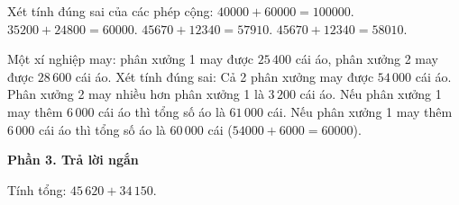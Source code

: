\begin{ex} %
Xét tính đúng sai của các phép cộng:
\choiceTF
{\True $40000 + 60000 = 100000$.}
{\True $35200 + 24800 = 60000$.}
{$45670 + 12340 = 57910$.}
{\True $45670 + 12340 = 58010$.}
\end{ex}

\begin{ex} %
Một xí nghiệp may: phân xưởng 1 may được $25\,400$ cái áo, phân xưởng 2 may được $28\,600$ cái áo. Xét tính đúng sai:
\choiceTF
{\True Cả 2 phân xưởng may được $54\,000$ cái áo.}
{\True Phân xưởng 2 may nhiều hơn phân xưởng 1 là $3\,200$ cái áo.}
{Nếu phân xưởng 1 may thêm $6\,000$ cái áo thì tổng số áo là $61\,000$ cái.}
{\True Nếu phân xưởng 1 may thêm $6\,000$ cái áo thì tổng số áo là $60\,000$ cái ($54000 + 6000 = 60000$).}
\end{ex}

\textbf{Phần 3. Trả lời ngắn}

\begin{ex} %
Tính tổng: $45\,620 + 34\,150$.
\end{ex}

